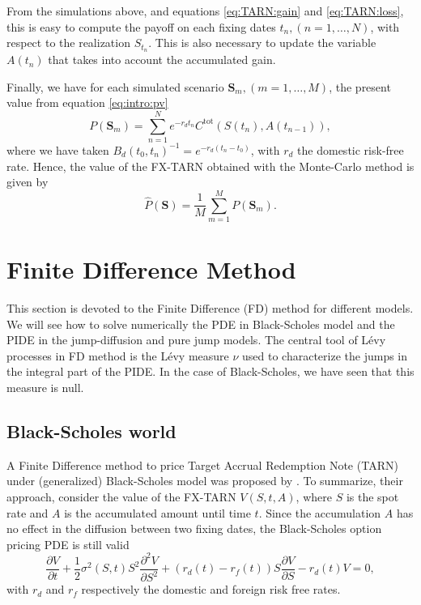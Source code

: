 From the simulations above, and equations \eqref{eq:TARN:gain} and \eqref{eq:TARN:loss}, this is easy to compute the payoff on each fixing dates $t_n, (n=1,\ldots,N)$, with respect to the realization $S_{t_n}$. This is also necessary to update the variable $A(t_n)$ that takes into account the accumulated gain. 

Finally, we have for each simulated scenario $\mathbf{S}_m, (m=1,\ldots,M)$, the present value from equation \eqref{eq:intro:pv}
$$P(\mathbf{S}_m) = \sum_{n=1}^{N}e^{-r_d t_n}C^\text{tot}(S(t_n),A(t_{n-1})),$$
where we have taken $B_d(t_0,t_n)^{-1}=e^{-r_d (t_n-t_0)}$, with $r_d$ the domestic risk-free rate. Hence, the value of the FX-TARN obtained with the Monte-Carlo method is given by
$$\hat{P}(\mathbf{S})=\frac{1}{M}\sum_{m=1}^M P(\mathbf{S}_m).$$

\section{Finite Difference Method}
\label{sec:methods:FD}
This section is devoted to the Finite Difference (FD) method for different models. We will see how to solve numerically the PDE in Black-Scholes model and the PIDE in the jump-diffusion and pure jump models. The central tool of L\'evy processes in FD method is the L\'evy measure $\nu$ used to characterize the jumps in the integral part of the PIDE. In the case of Black-Scholes, we have seen that this measure is null.

\subsection{Black-Scholes world}
A Finite Difference method to price Target Accrual Redemption Note (TARN) under (generalized) Black-Scholes model was proposed by \citeauthor{LS15} \citeyearpar{LS15} \cite{LS15}. To summarize, their approach, consider the value of the FX-TARN $V(S,t,A)$, where $S$ is the spot rate and $A$ is the accumulated amount until time $t$. Since the accumulation $A$ has no effect in the diffusion between two fixing dates, the Black-Scholes option pricing PDE is still valid
\begin{equation}\label{eq:PDE}
\frac{\partial V}{\partial t}+\frac{1}{2}\sigma^2(S,t)S^2\frac{\partial^2 V}{\partial S^2}+\left(r_d(t) -r_f(t)\right)S\frac{\partial V}{\partial S}-r_d(t) V = 0,
\end{equation}
with $r_d$ and $r_f$ respectively the domestic and foreign risk free rates.

